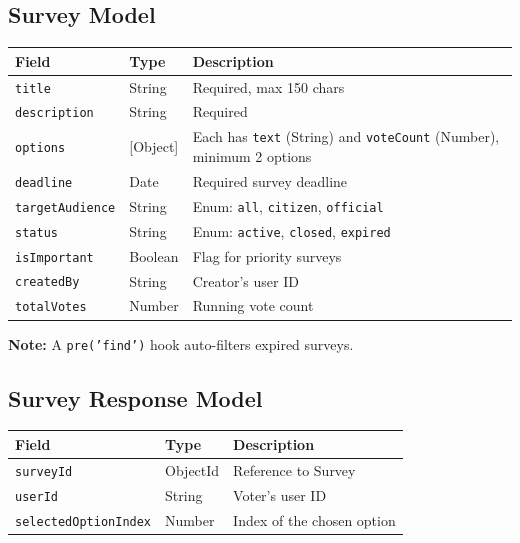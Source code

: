 \documentclass[12pt,a4paper]{article}
\begin{document}
\subsection{Survey Model}

\begin{longtable}{@{}llp{5.5cm}@{}}
\toprule
\textbf{Field} & \textbf{Type} & \textbf{Description} \\
\midrule
\endhead
\texttt{title}          & String   & Required, max 150 chars \\
\texttt{description}    & String   & Required \\
\texttt{options}        & [Object] & Each has \texttt{text} (String) and \texttt{voteCount} (Number), minimum 2 options \\
\texttt{deadline}       & Date     & Required survey deadline \\
\texttt{targetAudience} & String   & Enum: \texttt{all}, \texttt{citizen}, \texttt{official} \\
\texttt{status}         & String   & Enum: \texttt{active}, \texttt{closed}, \texttt{expired} \\
\texttt{isImportant}    & Boolean  & Flag for priority surveys \\
\texttt{createdBy}      & String   & Creator's user ID \\
\texttt{totalVotes}     & Number   & Running vote count \\
\bottomrule
\end{longtable}

\noindent\textbf{Note:} A \texttt{pre('find')} hook auto-filters expired surveys.

\subsection{Survey Response Model}

\begin{longtable}{@{}llp{5.5cm}@{}}
\toprule
\textbf{Field} & \textbf{Type} & \textbf{Description} \\
\midrule
\endhead
\texttt{surveyId}            & ObjectId & Reference to Survey \\
\texttt{userId}              & String   & Voter's user ID \\
\texttt{selectedOptionIndex} & Number   & Index of the chosen option \\
\bottomrule
\end{longtable}
\end{document}
